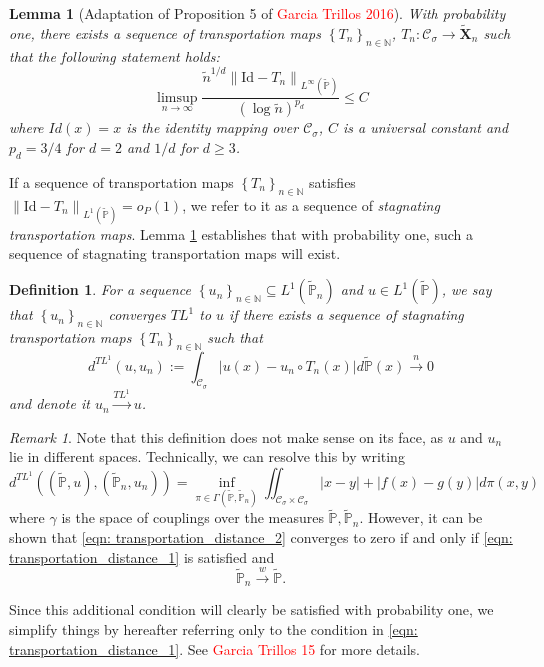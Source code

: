 \documentclass{article}
\newcommand{\norm}[1]{\left\lVert#1\right\rVert}
\newcommand{\abs}[1]{\left \lvert #1 \right \rvert}
\newcommand{\set}[1]{\left\{#1\right\}}
\newcommand{\seq}[1]{\set{#1}_{n \in \N}}
\newcommand{\N}{\mathbb{N}}
\newcommand{\Xbf}{\mathbf{X}}
\newcommand{\Cset}{\mathcal{C}}
\newcommand{\Csig}{\Cset_{\sigma}}
\newcommand{\Pbb}{\mathbb{P}}
\newcommand{\1}{\mathbf{1}}
\theoremstyle{alden}
\newtheorem{definition}{Definition}[section]
\theoremstyle{aldenthm}
\newtheorem{lemma}{Lemma}
\theoremstyle{remark}
\newtheorem{remark}{Remark}
\begin{document}
\begin{lemma}[Adaptation of Proposition 5 of \textcolor{red}{Garcia Trillos 2016}]
	\label{lem: stagnating_transportation_maps}
	With probability one, there exists a sequence of transportation maps $\seq{T_n}$, $T_n: \Csig \to \widetilde{\Xbf}_n$ such that the following statement holds:
	\begin{equation*}
	\limsup_{n \to \infty} \frac{\widetilde{n}^{1/d} \norm{\mathrm{Id} - T_n}_{L^{\infty}(\widetilde{\Pbb})}}{(\log \widetilde{n})^{p_d}} \leq C
	\end{equation*}
	where $Id(x) = x$ is the identity mapping over $\Csig$, $C$ is a universal constant and $p_d = 3/4$ for $d = 2$ and $1/d$ for $d \geq 3$.
\end{lemma}
If a sequence of transportation maps $\seq{T_n}$ satisfies $\norm{\mathrm{Id} - T_n}_{L^{1}(\widetilde{\Pbb})} = o_P(1)$, we refer to it as a sequence of \emph{stagnating transportation maps}. Lemma \ref{lem: stagnating_transportation_maps} establishes that with probability one, such a sequence of stagnating transportation maps will exist.

\begin{definition}
	For a sequence $\seq{u_n} \subseteq L^1(\widetilde{\Pbb}_n)$ and $u \in L^1(\widetilde{\Pbb})$, we say that $\seq{u_n}$ converges $TL^1$ to $u$ if there exists a sequence of stagnating transportation maps $\seq{T_n}$ such that
	\begin{equation}
	\label{eqn: transportation_distance_1}
	d^{TL^1}(u,u_n) := \int_{\Csig} \abs{u(x) - u_n \circ T_n(x)} d \widetilde{\Pbb}(x) \overset{n}{\to} 0 
	\end{equation}
	and denote it $u_n \overset{TL^1}{\to} u$.
\end{definition}

\begin{remark}
	\label{rmk: transportation_distance_equivalence}
	Note that this definition does not make sense on its face, as $u$ and $u_n$ lie in different spaces. Technically, we can resolve this by writing
	\begin{equation}
	\label{eqn: transportation_distance_2}
	d^{TL^1}((\widetilde{\Pbb}, u),(\widetilde{\Pbb}_n,u_n)) = \inf_{\pi \in \Gamma(\widetilde{\Pbb},\widetilde{\Pbb}_n)} \iint_{\Csig \times \Csig} \abs{x - y} + \abs{f(x) - g(y)} d\pi(x,y)
	\end{equation}
	where $\gamma$ is the space of couplings over the measures $\widetilde{\Pbb}, \widetilde{\Pbb}_n$. However, it can be shown that \eqref{eqn: transportation_distance_2} converges to zero if and only if \eqref{eqn: transportation_distance_1} is satisfied and 
	\begin{equation*}
	\widetilde{\Pbb}_n \overset{w}{\to} \widetilde{\Pbb}.
	\end{equation*}
	
	Since this additional condition will clearly be satisfied with probability one, we simplify things by hereafter referring only to the condition in \eqref{eqn: transportation_distance_1}. See \textcolor{red}{Garcia Trillos 15} for more details.
\end{remark}
\end{document}
